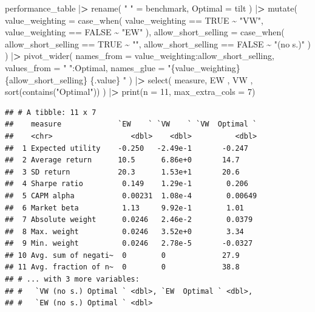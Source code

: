 \documentclass[
]{book}
\newenvironment{Shaded}{\begin{snugshade}}{\end{snugshade}}
\newcommand{\AttributeTok}[1]{\textcolor[rgb]{0.61,0.61,0.61}{#1}}
\newcommand{\ConstantTok}[1]{\textcolor[rgb]{0,0,0}{#1}}
\newcommand{\DecValTok}[1]{\textcolor[rgb]{0.06,0.06,0.06}{#1}}
\newcommand{\ErrorTok}[1]{\textcolor[rgb]{0.14,0.14,0.14}{\textbf{#1}}}
\newcommand{\FunctionTok}[1]{\textcolor[rgb]{0,0,0}{#1}}
\newcommand{\NormalTok}[1]{#1}
\newcommand{\OtherTok}[1]{\textcolor[rgb]{0.37,0.37,0.37}{#1}}
\newcommand{\SpecialCharTok}[1]{\textcolor[rgb]{0,0,0}{#1}}
\newcommand{\StringTok}[1]{\textcolor[rgb]{0.5,0.5,0.5}{#1}}
\begin{document}
\begin{Shaded}
\begin{Highlighting}[]
\NormalTok{performance\_table }\SpecialCharTok{|}\ErrorTok{\textgreater{}}
  \FunctionTok{rename}\NormalTok{(}
    \StringTok{" "} \OtherTok{=}\NormalTok{ benchmark,}
    \AttributeTok{Optimal =}\NormalTok{ tilt}
\NormalTok{  ) }\SpecialCharTok{|}\ErrorTok{\textgreater{}}
  \FunctionTok{mutate}\NormalTok{(}
    \AttributeTok{value\_weighting =} \FunctionTok{case\_when}\NormalTok{(}
\NormalTok{      value\_weighting }\SpecialCharTok{==} \ConstantTok{TRUE} \SpecialCharTok{\textasciitilde{}} \StringTok{"VW"}\NormalTok{,}
\NormalTok{      value\_weighting }\SpecialCharTok{==} \ConstantTok{FALSE} \SpecialCharTok{\textasciitilde{}} \StringTok{"EW"}
\NormalTok{    ),}
    \AttributeTok{allow\_short\_selling =} \FunctionTok{case\_when}\NormalTok{(}
\NormalTok{      allow\_short\_selling }\SpecialCharTok{==} \ConstantTok{TRUE} \SpecialCharTok{\textasciitilde{}} \StringTok{""}\NormalTok{,}
\NormalTok{      allow\_short\_selling }\SpecialCharTok{==} \ConstantTok{FALSE} \SpecialCharTok{\textasciitilde{}} \StringTok{"(no s.)"}
\NormalTok{    )}
\NormalTok{  ) }\SpecialCharTok{|}\ErrorTok{\textgreater{}}
  \FunctionTok{pivot\_wider}\NormalTok{(}
    \AttributeTok{names\_from =}\NormalTok{ value\_weighting}\SpecialCharTok{:}\NormalTok{allow\_short\_selling,}
    \AttributeTok{values\_from =} \StringTok{" "}\SpecialCharTok{:}\NormalTok{Optimal,}
    \AttributeTok{names\_glue =} \StringTok{"\{value\_weighting\} \{allow\_short\_selling\} \{.value\} "}
\NormalTok{  ) }\SpecialCharTok{|}\ErrorTok{\textgreater{}}
  \FunctionTok{select}\NormalTok{(}
\NormalTok{    measure,}
    \StringTok{\textasciigrave{}}\AttributeTok{EW    }\StringTok{\textasciigrave{}}\NormalTok{,}
    \StringTok{\textasciigrave{}}\AttributeTok{VW    }\StringTok{\textasciigrave{}}\NormalTok{,}
    \FunctionTok{sort}\NormalTok{(}\FunctionTok{contains}\NormalTok{(}\StringTok{"Optimal"}\NormalTok{))}
\NormalTok{  ) }\SpecialCharTok{|}\ErrorTok{\textgreater{}}
  \FunctionTok{print}\NormalTok{(}\AttributeTok{n =} \DecValTok{11}\NormalTok{, }\AttributeTok{max\_extra\_cols =} \DecValTok{7}\NormalTok{)}
\end{Highlighting}
\end{Shaded}

\begin{verbatim}
## # A tibble: 11 x 7
##    measure             `EW    ` `VW    ` `VW  Optimal `
##    <chr>                  <dbl>    <dbl>          <dbl>
##  1 Expected utility    -0.250   -2.49e-1       -0.247  
##  2 Average return      10.5      6.86e+0       14.7    
##  3 SD return           20.3      1.53e+1       20.6    
##  4 Sharpe ratio         0.149    1.29e-1        0.206  
##  5 CAPM alpha           0.00231  1.08e-4        0.00649
##  6 Market beta          1.13     9.92e-1        1.01   
##  7 Absolute weight      0.0246   2.46e-2        0.0379 
##  8 Max. weight          0.0246   3.52e+0        3.34   
##  9 Min. weight          0.0246   2.78e-5       -0.0327 
## 10 Avg. sum of negati~  0        0             27.9    
## 11 Avg. fraction of n~  0        0             38.8    
## # ... with 3 more variables:
## #   `VW (no s.) Optimal ` <dbl>, `EW  Optimal ` <dbl>,
## #   `EW (no s.) Optimal ` <dbl>
\end{verbatim}
\end{document}
